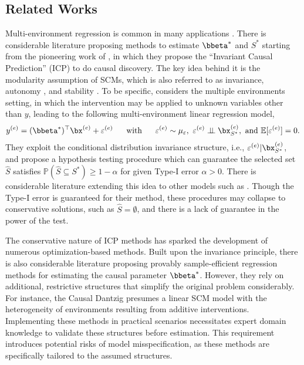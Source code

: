 \documentclass[10pt]{article}
\numberwithin{equation}{section}
\newcommand{\indep}{\perp \!\!\! \perp}
\begin{document}
{\subsection{Related Works}

Multi-environment regression is common in many applications \citep{meinshausen2016methods, vcuklina2021diagnostics}. There is considerable literature proposing methods to estimate $\bbeta^*$ and $S^*$ starting from the pioneering work of \cite{peters2016causal}, in which they propose the ``Invariant Causal Prediction'' (ICP) to do causal discovery. The key idea behind it is the modularity assumption of SCMs, which is also referred to as invariance, autonomy \citep{haavelmo1944probability, aldrich1989autonomy}, and stability \citep{dawid2010identifying}. To be specific, \cite{peters2016causal} considers the multiple environments setting, in which the intervention may be applied to unknown variables other than $y$, leading to the following multi-environment linear regression model,
\begin{align}
\label{eq:intro-icp-cond}
    y^{(e)} = (\bbeta^*)^\top\bx^{(e)} + \varepsilon^{(e)} ~~~~~ \text{with} ~~~~~ \varepsilon^{(e)} \sim \mu_\varepsilon, ~\varepsilon^{(e)} \indep \bx_{S^*}^{(e)}, ~\text{and}~\mathbb{E}[\varepsilon^{(e)}]=0.
\end{align} They exploit the conditional distribution invariance structure, i.e., $\varepsilon^{(e)}|\bx_{S^*}^{(e)}$, and propose a hypothesis testing procedure which can guarantee the selected set $\hat{S}$ satisfies $\mathbb{P}(\hat{S} \subseteq S^*) \ge 1-\alpha$ for given Type-I error $\alpha>0$. There is considerable literature extending this idea to other models such as \cite{heinze2018invariant, pfister2019invariant}. Though the Type-I error is guaranteed for their method, these procedures may collapse to conservative solutions, such as $\hat{S}=\emptyset$, and there is a lack of guarantee in the power of the test.

The conservative nature of ICP methods has sparked the development of numerous optimization-based methods. Built upon the invariance principle, there is also considerable literature \citep{ghassami2017learning, rothenhausler2019causal, rothenhausler2021anchor} proposing provably sample-efficient regression methods for estimating the causal parameter $\bbeta^*$. However, they rely on additional, restrictive structures that simplify the original problem considerably. For instance, the Causal Dantzig \citep{rothenhausler2019causal} presumes a linear SCM model with the heterogeneity of environments resulting from additive interventions. Implementing these methods in practical scenarios necessitates expert domain knowledge to validate these structures before estimation. This requirement introduces potential risks of model misspecification, as these methods are specifically tailored to the assumed structures.

}
\end{document}
